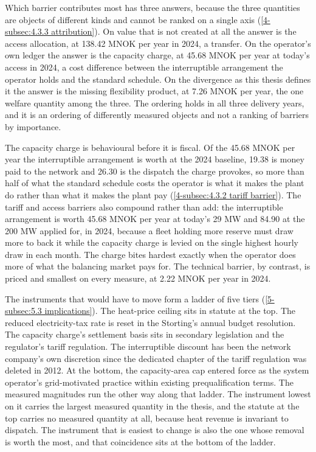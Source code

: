 Which barrier contributes most has three answers, because the three quantities are objects of different kinds and cannot be ranked on a single axis (\autoref{4-subsec:4.3.3 attribution}). On value that is not created at all the answer is the access allocation, at 138.42 MNOK per year in 2024, a transfer. On the operator's own ledger the answer is the capacity charge, at 45.68 MNOK per year at today's access in 2024, a cost difference between the interruptible arrangement the operator holds and the standard schedule. On the divergence as this thesis defines it the answer is the missing flexibility product, at 7.26 MNOK per year, the one welfare quantity among the three. The ordering holds in all three delivery years, and it is an ordering of differently measured objects and not a ranking of barriers by importance.

The capacity charge is behavioural before it is fiscal. Of the 45.68 MNOK per year the interruptible arrangement is worth at the 2024 baseline, 19.38 is money paid to the network and 26.30 is the dispatch the charge provokes, so more than half of what the standard schedule costs the operator is what it makes the plant do rather than what it makes the plant pay (\autoref{4-subsec:4.3.2 tariff barrier}). The tariff and access barriers also compound rather than add: the interruptible arrangement is worth 45.68 MNOK per year at today's 29 MW and 84.90 at the 200 MW applied for, in 2024, because a fleet holding more reserve must draw more to back it while the capacity charge is levied on the single highest hourly draw in each month. The charge bites hardest exactly when the operator does more of what the balancing market pays for. The technical barrier, by contrast, is priced and smallest on every measure, at 2.22 MNOK per year in 2024.

The instruments that would have to move form a ladder of five tiers (\autoref{5-subsec:5.3 implications}). The heat-price ceiling sits in statute at the top. The reduced electricity-tax rate is reset in the Storting's annual budget resolution. The capacity charge's settlement basis sits in secondary legislation and the regulator's tariff regulation. The interruptible discount has been the network company's own discretion since the dedicated chapter of the tariff regulation was deleted in 2012. At the bottom, the capacity-area cap entered force as the system operator's grid-motivated practice within existing prequalification terms. The measured magnitudes run the other way along that ladder. The instrument lowest on it carries the largest measured quantity in the thesis, and the statute at the top carries no measured quantity at all, because heat revenue is invariant to dispatch. The instrument that is easiest to change is also the one whose removal is worth the most, and that coincidence sits at the bottom of the ladder.

